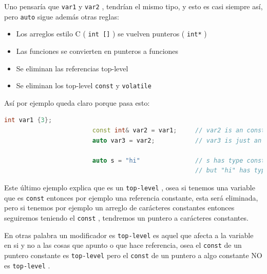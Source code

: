 \documentclass[12pt, fleqn]{report}                             %
\theoremstyle{break}                                            %
\newcommand{\textCode}[1]  { \texttt{#1} }                      %
\begin{document}
                    Uno pensaría que \textCode{var1} y \textCode{var2}, tendrían el mismo tipo, y esto es casi siempre
                    así, pero \textCode{auto} sigue además otras reglas:
                    
                    \begin{itemize}
                        \item Los arreglos estilo C (\textCode{int []}) se vuelven punteros (\textCode{int*})
                        \item Las funciones se convierten en punteros a funciones
                        \item Se eliminan las referencias top-level
                        \item Se eliminan los top-level \textCode{const} y  \textCode{volatile}
                    \end{itemize}

                    Así por ejemplo queda claro porque pasa esto:
                    \begin{lstlisting}[language=C++, gobble=24]
                        int var1 {3};
                        const int& var2 = var1;     // var2 is an const int&
                        auto var3 = var2;           // var3 is just an int

                        auto s = "hi"               // s has type const char*
                                                    // but "hi" has type const char[3]
                    \end{lstlisting}

                    Este último ejemplo explica que es un \textCode{top-level}, osea si tenemos una variable
                    que es \textCode{const} entonces por ejemplo una referencia constante, esta será eliminada, 
                    pero si tenemos por ejemplo un arreglo de carácteres constantes entonces seguiremos teniendo
                    el \textCode{const}, tendremos un puntero a carácteres constantes.

                    En otras palabra un modificador es \textCode{top-level} es aquel que afecta a la variable
                    en si y no a las cosas que apunto o que hace referencia, osea el \textCode{const}
                    de un puntero constante es \textCode{top-level} pero el \textCode{const} de un puntero a 
                    algo constante NO es \textCode{top-level}.
                
                \clearpage
\end{document}
